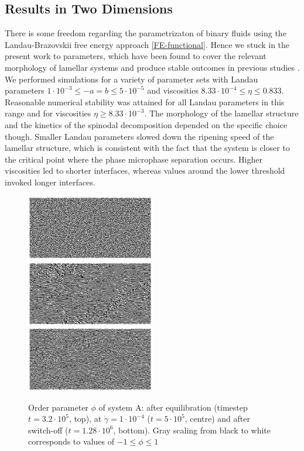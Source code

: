 \documentclass[8.5pt,twoside,twocolumn]{article}
\newcommand{\e}[1]{\cdot10^{#1}}
\begin{document}
\subsection*{Results in Two Dimensions}
There is some freedom regarding the parametrizaton of binary fluids using the Landau-Brazovskii free energy approach \ref{FE-functional}.
Hence we stuck in the present work to parameters, which have been found to cover the relevant morphology of lamellar systems and produce stable outcomes in previous studies \cite{Kendon01,Xu03, Xu06b}. 
We performed simulations for a variety of parameter sets with Landau parameters $1\cdot10^{-3}\le-a=b\le5\cdot10^{-5}$ and viscosities $8.33\cdot10^{-4}\le\eta\le 0.833$.
Reasonable numerical stability was attained for all Landau parameters in this range and for viscosities $\eta\ge 8.33\e{-3}$.
The morphology of the lamellar structure and the kinetics of the spinodal decomposition depended on the specific choice though.
Smaller Landau parameters slowed down the ripening speed of the lamellar structure, which is consistent with the fact that the system is closer to the critical point where the phase microphase separation occurs.
Higher viscosities led to shorter interfaces, whereas values around the lower threshold invoked longer interfaces.
\begin{figure}[!]
\centering
\includegraphics[angle=0,width=0.5\textwidth]{phi_run703_320.jpg}\\
\includegraphics[angle=0,width=0.5\textwidth]{phi_run704_500.jpg}\\
\includegraphics[angle=0,width=0.5\textwidth]{phi_run705_1280.jpg}
\caption{Order parameter $\phi$ of system A: after equilibration (timestep $t=3.2\e{5}$, top), at $\dot{\gamma}=1\cdot10^{-4}$ ($t=5\e{5}$, centre) and after switch-off ($t=1.28\e{6}$, bottom). Gray scaling from black to white corresponds to values of $-1\le\phi\le1$}
\label{fig1}
\end{figure}
\end{document}
